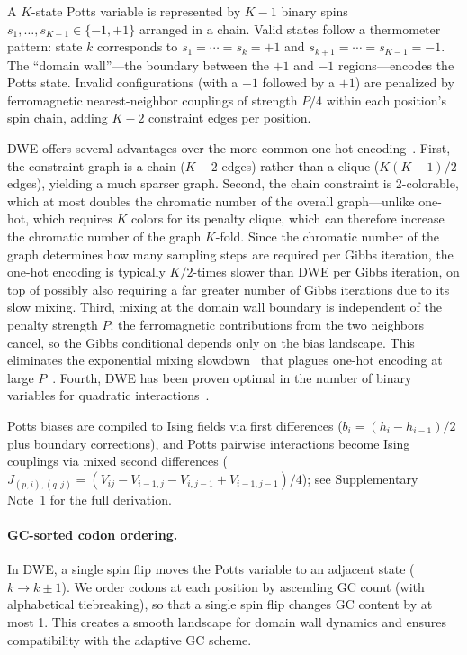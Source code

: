 \documentclass[11pt,twocolumn]{article}
\begin{document}
A $K$-state Potts variable is represented by $K{-}1$ binary spins $s_1, \ldots, s_{K-1} \in \{-1, +1\}$ arranged in a chain.
Valid states follow a thermometer pattern: state $k$ corresponds to $s_1 = \cdots = s_k = +1$ and $s_{k+1} = \cdots = s_{K-1} = -1$.
The ``domain wall''---the boundary between the $+1$ and $-1$ regions---encodes the Potts state.
Invalid configurations (with a $-1$ followed by a $+1$) are penalized by ferromagnetic nearest-neighbor couplings of strength $P/4$ within each position's spin chain, adding $K{-}2$ constraint edges per position.

DWE offers several advantages over the more common one-hot encoding~\cite{lucas2014ising}.
First, the constraint graph is a chain ($K{-}2$ edges) rather than a clique ($K(K{-}1)/2$ edges), yielding a much sparser graph.
Second, the chain constraint is 2-colorable, which at most doubles the chromatic number of the overall graph---unlike one-hot, which requires $K$ colors for its penalty clique, which can therefore increase the chromatic number of the graph $K$-fold. Since the chromatic number of the graph determines how many sampling steps are required per Gibbs iteration, the one-hot encoding is typically $K/2$-times slower than DWE per Gibbs iteration, on top of possibly also requiring a far greater number of Gibbs iterations due to its slow mixing.
Third, mixing at the domain wall boundary is independent of the penalty strength $P$: the ferromagnetic contributions from the two neighbors cancel, so the Gibbs conditional depends only on the bias landscape.
This eliminates the exponential mixing slowdown~\cite{levin2009markov} that plagues one-hot encoding at large $P$~\cite{berwald2022dwc}.
Fourth, DWE has been proven optimal in the number of binary variables for quadratic interactions~\cite{berwald2022dwc}.

Potts biases are compiled to Ising fields via first differences ($b_i = (h_i - h_{i-1})/2$ plus boundary corrections), and Potts pairwise interactions become Ising couplings via mixed second differences ($J_{(p,i),(q,j)} = (V_{ij} - V_{i-1,j} - V_{i,j-1} + V_{i-1,j-1})/4$); see Supplementary Note~1 for the full derivation.

\paragraph{GC-sorted codon ordering.}
In DWE, a single spin flip moves the Potts variable to an adjacent state ($k \to k \pm 1$).
We order codons at each position by ascending GC count (with alphabetical tiebreaking), so that a single spin flip changes GC content by at most 1.
This creates a smooth landscape for domain wall dynamics and ensures compatibility with the adaptive GC scheme.
\end{document}
